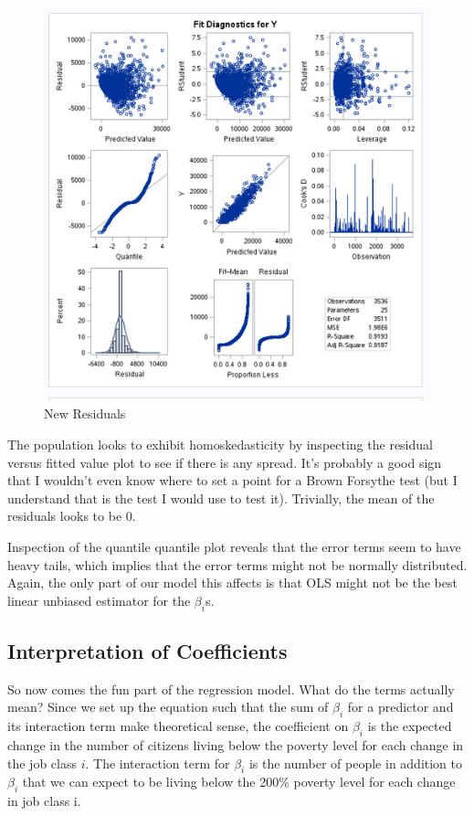 \begin{figure}
\centering
\includegraphics{Chapters/new_resid.png} 
\caption{New Residuals}
\label{fig:new_resid}
\end{figure}


The population looks to exhibit homoskedasticity by inspecting the residual versus fitted value plot to see if there is any spread. It's probably a good sign that I wouldn't even know where to set a point for a Brown Forsythe test (but I understand that is the test I would use to test it). Trivially, the mean of the residuals looks to be 0. 

Inspection of the quantile quantile plot reveals that the error terms seem to have heavy tails, which implies that the error terms might not be normally distributed. Again, the only part of our model this affects is that OLS might not be the best linear unbiased estimator for the $\beta_i$s. 

\subsection{Interpretation of Coefficients}

So now comes the fun part of the regression model. What do the terms actually mean? Since we set up the equation such that the sum of $\beta_i$ for a predictor and its interaction term make theoretical sense, the coefficient on $\beta_i$ is the expected change in the number of citizens living below the poverty level for each change in the job class $i$. The interaction term for $\beta_i$ is the number of people in addition to $\beta_i$ that we can expect to be living below the 200\% poverty level for each change in job class i.

